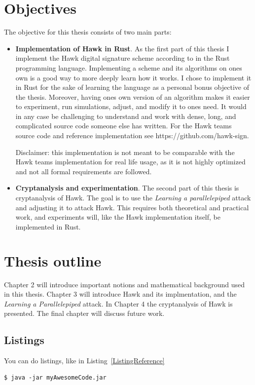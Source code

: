 \section{Objectives}
The objective for this thesis consists of two main parts:
\begin{itemize}
    \item \textbf{Implementation of Hawk in Rust}. As the first part of this thesis I implement the Hawk digital signature scheme according to \cite{HawkSpec24} in the Rust programming language. 
    Implementing a scheme and its algorithms on ones own is a good way to more deeply learn how it works. I chose to implement it in Rust for the sake of learning the language as a personal bonus objective of the thesis.
    Moreover, having ones own version of an algorithm makes it easier to experiment, run simulations, adjust, and modify it to ones need. It would in any case be challenging to understand and work with dense, long, 
    and complicated source code someone else has written. For the Hawk teams source code and reference implementation see https://github.com/hawk-sign.

    Disclaimer: this implementation is not meant to be comparable with the Hawk teams implementation for real life usage, as it is not highly optimized and not all formal requirements are followed.

\item \textbf{Cryptanalysis and experimentation}. The second part of this thesis is cryptanalysis of Hawk. The goal is to use the \textit{Learning a parallelepiped} attack and adjusting it to attack Hawk. 
    This requires both theoretical and practical work, and experiments will, like the Hawk implementation itself, be implemented in Rust.
\end{itemize}
\section{Thesis outline}
Chapter 2 will introduce important notions and mathematical background used in this thesis. Chapter 3 will introduce Hawk and its implmentation, and the \textit{Learning a Parallelepiped} attack.
In Chapter 4 the cryptanalysis of Hawk is presented. The final chapter will discuss future work.


\subsection{Listings}
You can do listings, like in Listing~\ref{ListingReference}
\begin{lstlisting}[caption={[Short caption]Look at this cool listing. Find the rest in Appendix~\ref{Listing}},label=ListingReference]
$ java -jar myAwesomeCode.jar
\end{lstlisting}

